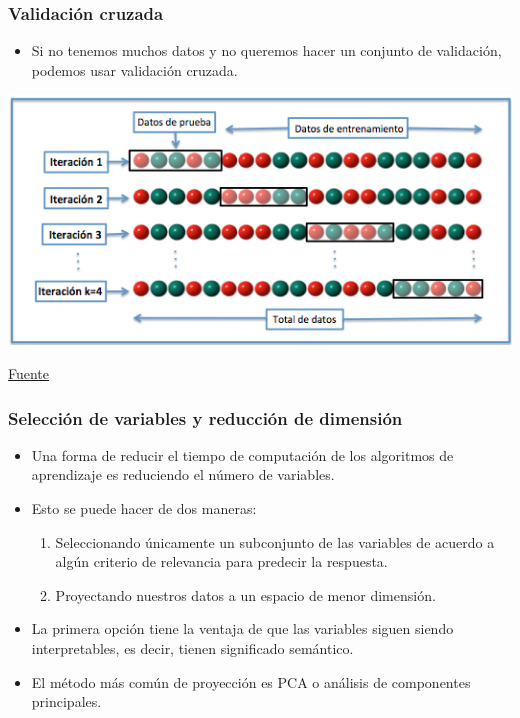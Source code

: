 \documentclass{beamer}
\begin{document}
\begin{frame}
\frametitle{Validación cruzada}
\begin{itemize}
\item Si no tenemos muchos datos y no queremos hacer un conjunto de validación, podemos usar validación cruzada.
\end{itemize}

\begin{center}
\includegraphics[width=1\textwidth]{crossval.jpg}

{\footnotesize \href{https://commons.wikimedia.org/w/index.php?curid=17616792}{Fuente}}
\end{center}
\end{frame}

\begin{frame}
\frametitle{Selección de variables y reducción de dimensión}

\begin{itemize}
\item Una forma de reducir el tiempo de computación de los algoritmos de aprendizaje es reduciendo el número de variables.
\item Esto se puede hacer de dos maneras:
\begin{enumerate}
\item Seleccionando únicamente un subconjunto de las variables de acuerdo a algún criterio de relevancia para predecir la respuesta.
\item Proyectando nuestros datos a un espacio de menor dimensión.
\end{enumerate}
\item La primera opción tiene la ventaja de que las variables siguen siendo interpretables, es decir, tienen significado semántico.
\item El método más común de proyección es PCA o análisis de componentes principales.
\end{itemize}
\end{frame}
\end{document}
